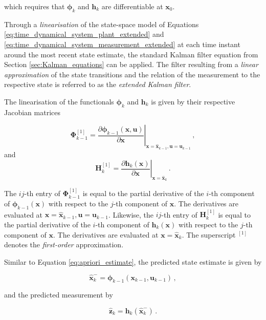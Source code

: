 \noindent
which requires that $\bm{\phi}_k$ and $\bm{h}_k$ are differentiable at $\bm{x}_0$.

Through a \emph{linearisation} of the state-space model of Equations \ref{eq:time_dynamical_system_plant_extended} and \ref{eq:time_dynamical_system_measurement_extended} at each time instant around the most recent state estimate, the standard Kalman filter equation from Section \ref{sec:Kalman_equations} can be applied. The filter resulting from a \emph{linear approximation} of the state transitions and the relation of the measurement to the respective state is referred to as the \emph{extended Kalman filter}.

The linearisation of the functionals $\bm{\phi}_k$ and $\bm{h}_k$ is given by their respective Jacobian matrices  

\begin{equation}\label{eq:Phi_first_order}
  \bm{\Phi}^{[1]}_{k-1} =  \left. \frac{\partial \bm{\phi}_{k-1}(\bm{x}, \bm{u})}{\partial \bm{x}} \right|_{\bm{x}=\hat{\bm{x}}_{k-1}, \bm{u} = \bm{u}_{k-1}} \,,
\end{equation}
and
\begin{equation}\label{eq:H_first_order}
  \bm{H}^{[1]}_{k} = \left. \frac{\partial \bm{h}_{k}(\bm{x})}{\partial \bm{x}} \right|_{\bm{x}=\hat{\bm{x}}_{k}} \,.
\end{equation}

\noindent
The $ij$-th entry of $\bm{\Phi}^{[1]}_{k-1}$ is equal to the partial derivative of the $i$-th component of $\bm{\phi}_{k-1}(\bm{x})$ with respect to the $j$-th component of $\bm{x}$. The derivatives are evaluated at $\bm{x}=\hat{\bm{x}}_{k-1}, \bm{u} = \bm{u}_{k-1}$. Likewise, the $ij$-th entry of $\bm{H}^{[1]}_{k}$ is equal to the partial derivative of the $i$-th component of $\bm{h}_{k}(\bm{x})$ with respect to the $j$-th component of $\bm{x}$. The derivatives are evaluated at $\bm{x}=\hat{\bm{x}}_{k}$. The superscript $^{[1]}$ denotes the \emph{first-order} approximation.


Similar to Equation \ref{eq:apriori_estimate}, the predicted state estimate is given by

\begin{equation}\label{eq:apriori_estimate_extended}
  \hat{\bm{x}}^{-}_k = \bm{\phi}_{k-1}(\bm{x}_{k-1}, \bm{u}_{k-1})\,,
\end{equation}

\noindent
and the predicted measurement by

\begin{equation}\label{eq:predicted_measurement_extended}
  \hat{\bm{z}}_k = \bm{h}_{k}(\hat{\bm{x}}^{-}_{k})\,.
\end{equation}

